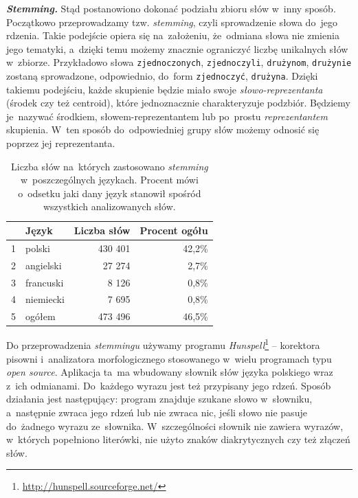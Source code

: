 \documentclass{praca1}
\begin{document}
\emph{\textbf{Stemming.}}
Stąd postanowiono dokonać podziału zbioru słów w~inny sposób. Początkowo przeprowadzamy tzw. \emph{stemming}, czyli sprowadzenie słowa do~jego rdzenia. Takie podejście opiera się na~założeniu, że~odmiana słowa nie zmienia jego tematyki, a~dzięki temu możemy znacznie ograniczyć liczbę unikalnych słów w~zbiorze. Przykładowo słowa \verb|zjednoczonych|, \verb|zjednoczyli|, \verb|drużynom|, \verb|drużynie| zostaną sprowadzone, odpowiednio, do~form \verb|zjednoczyć|, \verb|drużyna|. Dzięki takiemu podejściu, każde skupienie będzie miało swoje \emph{słowo-reprezentanta} (środek czy też centroid), które jednoznacznie charakteryzuje podzbiór. Będziemy je~nazywać środkiem, słowem-reprezentantem lub po~prostu \emph{reprezentantem} skupienia. W~ten sposób do~odpowiedniej grupy słów możemy odnosić się poprzez jej reprezentanta.

\begin{table}[!h]
\centering
\caption{Liczba słów na~których zastosowano \emph{stemming} w~poszczególnych językach. Procent mówi o~odsetku jaki dany język stanowił spośród wszystkich analizowanych słów.} \smallskip
\begin{tabular}{|rl|rr|}
  \hline
 & Język & Liczba słów & Procent ogółu\\ 
  \hline
1 & polski & 430 401 & 42,2\% \\ 
  2 & angielski & 27 274 & 2,7\% \\ 
  3 & francuski & 8 126 & 0,8\% \\ 
  4 & niemiecki & 7 695 & 0,8\% \\ \hline
  5 & ogółem & 473 496 & 46,5\% \\ 
   \hline
\end{tabular}
\label{tab:002}
\end{table}

Do przeprowadzenia \emph{stemmingu} używamy programu \emph{Hunspell}\footnote{\url{http://hunspell.sourceforge.net/}} -- korektora pisowni i~analizatora morfologicznego stosowanego w~wielu programach typu \emph{open source}. Aplikacja ta~ma wbudowany słownik słów języka polskiego wraz z~ich odmianami. Do~każdego wyrazu jest też przypisany jego rdzeń. Sposób działania jest następujący: program znajduje szukane słowo w~słowniku, a~następnie zwraca jego rdzeń lub nie zwraca nic, jeśli słowo nie pasuje do~żadnego wyrazu ze~słownika. W~szczególności słownik nie zawiera wyrazów, w~których popełniono literówki, nie użyto znaków diakrytycznych czy też złączeń słów.
\end{document}
